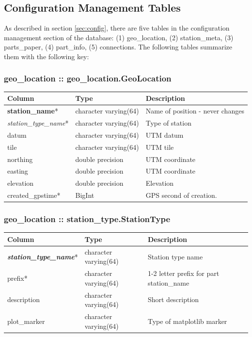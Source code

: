 \documentclass{article}
\begin{document}

\subsection{Configuration Management Tables}
As described in section  \ref{sec:config}, there are five tables in the configuration management section of the database:  (1) geo\_location, (2) station\_meta,
(3) parts\_paper, (4) part\_info, (5) connections.  The following tables summarize them with the following key:  

\subsubsection{geo\_location :: geo\_location.GeoLocation}
\begin{center}
\begin{tabular}{| p{4cm} | p{2cm} | p{10cm} |}
\hline
 {\bf Column} & {\bf Type}  & {\bf Description} \\ [0.5ex]  \hline\hline
{\bf station\_name}*  & character varying(64) & Name of position - never changes \\ \hline
{\em station\_type\_name}* & character varying(64) & Type of station \\ \hline
datum & character varying(64) & UTM datum \\ \hline
tile & character varying(64) & UTM tile \\ \hline
northing & double precision & UTM coordinate \\ \hline
easting & double precision & UTM coordinate \\ \hline
elevation & double precision & Elevation \\ \hline
created\_gpstime* & BigInt & GPS second of creation. \\ \hline
\end{tabular}
\end{center}

\subsubsection{geo\_location :: station\_type.StationType}
\begin{center}
\begin{tabular}{| p{4cm} | p{2cm} | p{10cm} |}
\hline
 {\bf Column} & {\bf Type}  & {\bf Description} \\ [0.5ex]  \hline\hline
{\bf \em station\_type\_name}* &  character varying(64) &  Station type name \\ \hline
prefix* & character varying(64) & 1-2 letter prefix for part station\_name \\ \hline
description & character varying(64) &  Short description \\ \hline
plot\_marker & character varying(64) & Type of matplotlib marker \\ \hline
\end{tabular}
\end{center}
\end{document}
